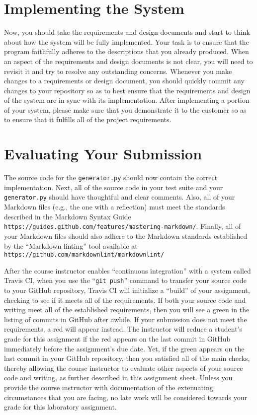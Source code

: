 \documentclass[11pt]{article}
\newcommand{\mainprogram}{\lstinline{generator.py}}
\newcommand{\gitpush}{\command{git push}}
\newcommand{\command}[1]{``\lstinline{#1}''}
\newcommand{\url}[1]{\lstinline{#1}}
\newcommand{\step}[1]{``{#1}''}
\newcommand{\checkmark}{\ding{51}}
\newcommand{\naughtmark}{\ding{55}}
\begin{document}
\section*{Implementing the System}

Now, you should take the requirements and design documents and start to think about how the system will be fully
implemented. Your task is to ensure that the program faithfully adheres to the descriptions that you already produced.
When an aspect of the requirements and design documents is not clear, you will need to revisit it and try to resolve any
outstanding concerns. Whenever you make changes to a requirements or design document, you should quickly commit any
changes to your repository so as to best ensure that the requirements and design of the system are in sync with its
implementation. After implementing a portion of your system, please make sure that you demonstrate it to the customer so
as to ensure that it fulfills all of the project requirements.

\section*{Evaluating Your Submission}

The source code for the \mainprogram{} should now contain the correct implementation. Next, all of the source code in
your test suite and your \mainprogram{} should have thoughtful and clear comments. Also, all of your Markdown files
(e.g., the one with a reflection) must meet the standards described in the Markdown Syntax Guide
\url{https://guides.github.com/features/mastering-markdown/}. Finally, all of your Markdown files should also adhere to
the Markdown standards established by the \step{Markdown linting} tool available at
\url{https://github.com/markdownlint/markdownlint/}

After the course instructor enables \step{continuous integration} with a system called Travis CI, when you use the
\gitpush{} command to transfer your source code to your GitHub repository, Travis CI will initialize a \step{build} of
your assignment, checking to see if it meets all of the requirements. If both your source code and writing meet all of
the established requirements, then you will see a green \checkmark{} in the listing of commits in GitHub after awhile.
If your submission does not meet the requirements, a red \naughtmark{} will appear instead. The instructor will reduce a
student's grade for this assignment if the red \naughtmark{} appears on the last commit in GitHub immediately before the
assignment's due date. Yet, if the green \checkmark{} appears on the last commit in your GitHub repository, then you
satisfied all of the main checks, thereby allowing the course instructor to evaluate other aspects of your source code
and writing, as further described in this assignment sheet. Unless you provide the course instructor with documentation
of the extenuating circumstances that you are facing, no late work will be considered towards your grade for this
laboratory assignment.
\end{document}
